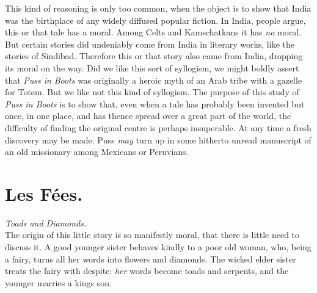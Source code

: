 \documentclass[14pt,a4paper]{memoir}
\newcommand{\notesection}[1]{%
  \addtonotes{\protect\par\protect\vspace{2ex}\protect\noindent\textbf{#1}\protect\par\protect\vspace{1ex}}%
}
\begin{document}
{This kind of reasoning is only too common, when the object is to show
that India was the birthplace of any widely diffused popular fiction. In
India, people argue, this or that tale has a moral. Among Celts and
Kamschatkans it has \emph{no} moral. But certain stories did undeniably
come from India in literary works, like the stories of Sindibad.
Therefore this or that story also came from India, dropping its moral on
the way. Did we like this sort of syllogism, we might boldly assert that
\emph{Puss in} \emph{Boots} was originally a heroic myth of an Arab
tribe with a gazelle for Totem. But we like not this kind of syllogism.
The purpose of this study of \emph{Puss in Boots} is to show that, even
when a tale has probably been invented but once, in one place, and has
thence spread over a great part of the world, the difficulty of finding
the original centre is perhaps insuperable. At any time a fresh
discovery may be made. Puss \emph{may} turn up in some hitherto unread
manuscript of an old missionary among Mexicans or
Peruvians.

\section{Les Fées.}
\notesection{Les Fées.}

\emph{Toads and Diamonds.} \\

The origin of this little story is so manifestly moral, that there is
little need to discuss it. A good younger sister behaves kindly to a
poor old woman, who, being a fairy, turns all her words into flowers and
diamonds. The wicked elder sister treats the fairy with despite:
\emph{her} words become toads and serpents, and the younger marries a
king\textquotesingle s son.

}
\end{document}
